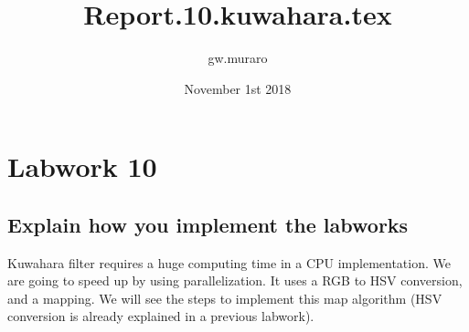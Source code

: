 \documentclass{article}
\title{Report.10.kuwahara.tex}
\author{gw.muraro}
\date{November 1st 2018}
\begin{document}
\maketitle
\section{Labwork 10}

\subsection{Explain how you implement the labworks}

    Kuwahara filter requires a huge computing time in a CPU implementation. We are going to speed up by using parallelization. It uses a RGB to HSV conversion, and a mapping. We will see the steps to implement this map algorithm (HSV conversion is already explained in a previous labwork).
   
\end{document}
